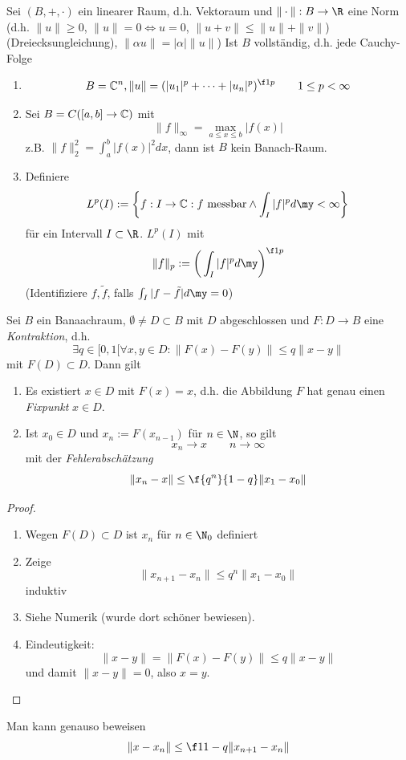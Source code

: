 \documentclass[a4paper,10pt]{scrbook}
\begin{document}
\begin{def} \label{1.1}
	Sei $(B,+,\cdot)$ ein linearer Raum, d.h. Vektoraum und $\|\cdot\|: B \to \R$ eine Norm (d.h. $\|u\| \ge 0$, $\|u\|=0 \iff u = 0$, $\|u+v\| \le \|u\| + \|v\|$) (Dreiecksungleichung), $\|\alpha u \| = |\alpha| \|u\|$)
	Ist $B$ vollständig, d.h. jede Cauchy-Folge
\end{def}

\begin{ex} \label{1.2}
	\begin{enumerate}[1)]
		\item
			\[
				B = \C^n, \|u\| = (|u_1|^p + \dotsb + |u_n|^p)^{\f 1p} \qquad 1 \le p < \infty
			\]
		\item
			Sei $B = C([a,b] \to \mathbb{C})$ mit
			\[
				\|f\|_\infty = \max_{a \le x \le b} |f(x)|
			\]
			z.B. $\|f\|_2^2 = \int_a^b |f(x)|^2 dx$, dann ist $B$ kein Banach-Raum.
		\item
			Definiere
			\[
				L^p(I) := \bigg\{ f : I \to \C : f \text{ messbar} \land \int_I |f|^p d\my < \infty \bigg\}
			\]
			für ein Intervall $I \subset \R$.
			$L^p(I)$ mit
			\[
				\|f\|_p := \bigg( \int_I |f|^p d\my \bigg)^{\f 1p}
			\]
			(Identifiziere $f,\tilde f$, falls $\int_I |f-\tilde f| d\my = 0$)
	\end{enumerate}
\end{ex}


\begin{st} \label{1.3}
	Sei $B$ ein Banaachraum, $\emptyset \neq D \subset B$ mit $D$ abgeschlossen und $F: D \to B$ eine \emph{Kontraktion}, d.h.
	\[
		\exists q \in [0,1[ \forall x,y \in D : \|F(x) - F(y)\| \le q\|x-y\|
	\]
	mit $F(D) \subset D$. Dann gilt
	\begin{enumerate}[1)]
		\item
			Es existiert $x\in D$ mit $F(x)=x$, d.h. die Abbildung $F$ hat genau einen \emph{Fixpunkt} $x\in D$.
		\item
			Ist $x_0 \in D$ und $x_n := F(x_{n-1})$ für $n\in \N$, so gilt
			\[
				x_n \to x \qquad n \to \infty
			\]
			mit der \emph{Fehlerabschätzung}
			\[
				\|x_n - x\| \le \f{q^n}{1-q} \|x_1 - x_0\|
			\]
	\end{enumerate}
	\begin{proof}
		\begin{enumerate}[1)]
			\item
				Wegen $F(D) \subset D$ ist $x_n$ für $n\in \N_0$ definiert
			\item
				Zeige
				\[
					\|x_{n+1} - x_n\| \le q^n \|x_1 - x_0\|
				\]
				induktiv
			\item
				Siehe Numerik (wurde dort schöner bewiesen).
			\item
				Eindeutigkeit:
				\[
					\|x-y\| = \|F(x) - F(y)\| \le q \|x-y\|
				\]
				und damit $\|x-y\| = 0$, also $x=y$.
		\end{enumerate}
	\end{proof}
\end{st}

\begin{nt} \label{1.4}
	Man kann genauso beweisen
	\[
		\|x - x_n\| \le \f 1{1-q} \|x_{n+1} -x_n \|
	\]
\end{nt}
\end{document}
